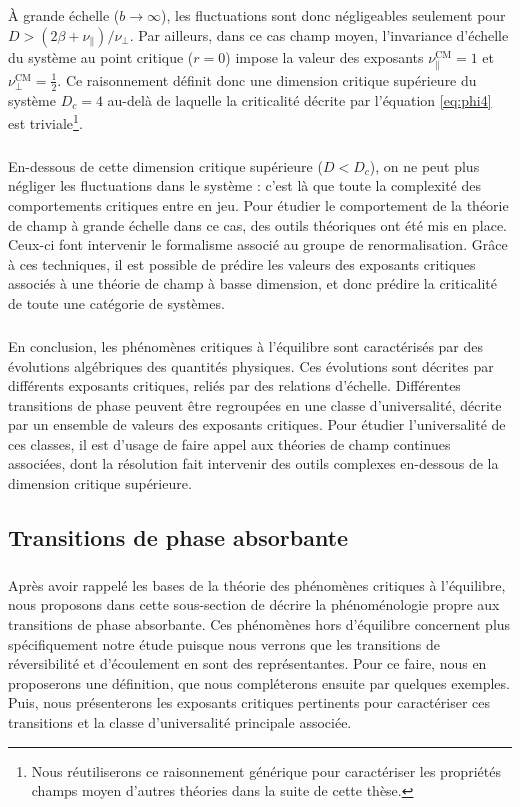\noindent \`A grande échelle ($b\rightarrow\infty$), les fluctuations sont donc négligeables seulement pour $D > (2\beta+\nu_\parallel)/\nu_\perp$. Par ailleurs, dans ce cas champ moyen, l'invariance d'échelle du système au point critique ($r=0$) impose la valeur des exposants $\nu_\parallel^\text{CM} = 1$ et $\nu_\perp^\text{CM} = \frac{1}{2}$. Ce raisonnement définit donc une dimension critique supérieure du système $D_c = 4$ au-delà de laquelle la criticalité décrite par l'équation \autoref{eq:phi4} est triviale\footnote{Nous réutiliserons ce raisonnement générique pour caractériser les propriétés champs moyen d'autres théories dans la suite de cette thèse.}. 

\subparagraph{}En-dessous de cette dimension critique supérieure ($D<D_c$), on ne peut plus négliger les fluctuations dans le système : c'est là que toute la complexité des comportements critiques entre en jeu. Pour étudier le comportement de la théorie de champ à grande échelle dans ce cas, des outils théoriques ont été mis en place. Ceux-ci font intervenir le formalisme associé au groupe de renormalisation. Grâce à ces techniques, il est possible de prédire les valeurs des exposants critiques associés à une théorie de champ à basse dimension, et donc prédire la criticalité de toute une catégorie de systèmes.

\subparagraph{}En conclusion, les phénomènes critiques à l'équilibre sont caractérisés par des évolutions algébriques des quantités physiques. Ces évolutions sont décrites par différents exposants critiques, reliés par des relations d'échelle. Différentes transitions de phase peuvent être regroupées en une classe d'universalité, décrite par un ensemble de valeurs des exposants critiques. Pour étudier l'universalité de ces classes, il est d'usage de faire appel aux théories de champ continues associées, dont la résolution fait intervenir des outils complexes en-dessous de la dimension critique supérieure.

\subsection{Transitions de phase absorbante}

\subparagraph{}Après avoir rappelé les bases de la théorie des phénomènes critiques à l'équilibre, nous proposons dans cette sous-section de décrire la phénoménologie propre aux transitions de phase absorbante. Ces phénomènes hors d'équilibre concernent plus spécifiquement notre étude puisque nous verrons que les transitions de réversibilité et d'écoulement en sont des représentantes. Pour ce faire, nous en proposerons une définition, que nous compléterons ensuite par quelques exemples. Puis, nous présenterons les exposants critiques pertinents pour caractériser ces transitions et la classe d'universalité principale associée.

